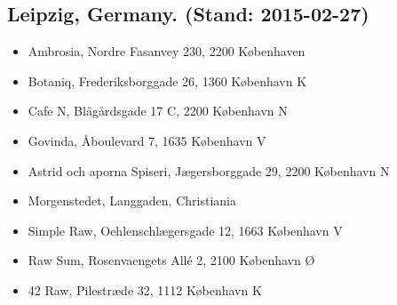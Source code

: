 \subsection{Leipzig, Germany. (Stand: 2015-02-27)}
\begin{itemize}
	\item Ambrosia, Nordre Fasanvey 230, 2200 K\o{}benhaven
	\item Botaniq, Frederiksborggade 26, 1360 K\o{}benhavn K
	\item Cafe N, Bl\aa{}g\aa{}rdsgade 17 C, 2200 K\o{}benhavn N
	\item Govinda, \AA{}boulevard 7, 1635 K\o{}benhavn V
	\item Astrid och aporna Spiseri, J\ae{}gersborggade 29, 2200 K\o{}benhavn N
	\item Morgenstedet, Langgaden, Christiania
	\item Simple Raw, Oehlenschl\ae{}gersgade 12, 1663 K\o{}benhavn V
	\item Raw Sum, Rosenvaengets All\'{e} 2, 2100 K\o{}benhavn \O{}
	\item 42 Raw, Pilestr\ae{}de 32, 1112 K\o{}benhavn K
\end{itemize}